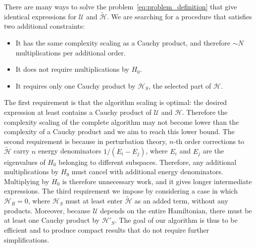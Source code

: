 There are many ways to solve the problem~\eqref{eq:problem_definition} that give identical expressions for $\mathcal{U}$ and $\tilde{\mathcal{H}}$.
We are searching for a procedure that satisfies two additional constraints:
%
\begin{itemize}
    \item It has the same complexity scaling as a Cauchy product, and therefore
    $\sim N$ multiplications per additional order.
    \item It does not require multiplications by $H_0$.
    \item It requires only one Cauchy product by $\mathcal{H}_{S}$, the selected
    part of $\mathcal{H}$.
\end{itemize}
%
The first requirement is that the algorithm scaling is optimal: the desired expression at least contains a Cauchy product of $\mathcal{U}$ and $\mathcal{H}$.
Therefore the complexity scaling of the complete algorithm may not become lower than the complexity of a Cauchy product and we aim to reach this lower bound.
The second requirement is because in perturbation theory, $n$-th order corrections to $\tilde{\mathcal{H}}$ carry $n$ energy denominators $1/(E_i - E_j)$, where $E_i$ and $E_j$ are the eigenvalues of $H_0$ belonging to different subspaces.
Therefore, any additional multiplications by $H_0$ must cancel with additional energy denominators.
Multiplying by $H_0$ is therefore unnecessary work, and it gives longer intermediate expressions.
The third requirement we impose by considering a case in which $\mathcal{H}_{R}=0$, where $\mathcal{H}_{S}$ must at least enter $\tilde{\mathcal{H}}$ as an added term, without any products.
Moreover, because $\mathcal{U}$ depends on the entire Hamiltonian, there must be at least one Cauchy product by $\mathcal{H}'_{S}$.
The goal of our algorithm is thus to be efficient and to produce compact results that do not require further simplifications.

